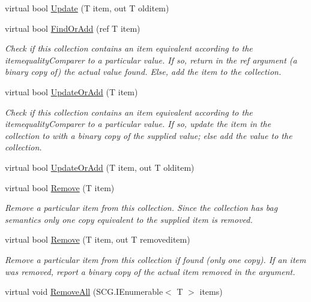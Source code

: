 \begin{DoxyCompactItemize}
virtual bool \hyperlink{class_c5_1_1_hashed_linked_list_a67ca2384da1dde0b651fe1ec01c8f0ba}{Update} (T item, out T olditem)
\item 
virtual bool \hyperlink{class_c5_1_1_hashed_linked_list_a71a1257a1ba4328713fb87daa3b45675}{Find\+Or\+Add} (ref T item)
\begin{DoxyCompactList}\small\item\em Check if this collection contains an item equivalent according to the itemequality\+Comparer to a particular value. If so, return in the ref argument (a binary copy of) the actual value found. Else, add the item to the collection. \end{DoxyCompactList}\item 
virtual bool \hyperlink{class_c5_1_1_hashed_linked_list_a5efb946b793ca1134c8f9d8b47d2cac7}{Update\+Or\+Add} (T item)
\begin{DoxyCompactList}\small\item\em Check if this collection contains an item equivalent according to the itemequality\+Comparer to a particular value. If so, update the item in the collection to with a binary copy of the supplied value; else add the value to the collection. \end{DoxyCompactList}\item 
virtual bool \hyperlink{class_c5_1_1_hashed_linked_list_a53e4be293af672a2354b7eb480ce48e6}{Update\+Or\+Add} (T item, out T olditem)
\item 
virtual bool \hyperlink{class_c5_1_1_hashed_linked_list_ad97f128fe00bf12c8e77678f08bd27e1}{Remove} (T item)
\begin{DoxyCompactList}\small\item\em Remove a particular item from this collection. Since the collection has bag semantics only one copy equivalent to the supplied item is removed. \end{DoxyCompactList}\item 
virtual bool \hyperlink{class_c5_1_1_hashed_linked_list_ab1348cf4b0e02e147f6dd08a539e2c61}{Remove} (T item, out T removeditem)
\begin{DoxyCompactList}\small\item\em Remove a particular item from this collection if found (only one copy). If an item was removed, report a binary copy of the actual item removed in the argument. \end{DoxyCompactList}\item 
virtual void \hyperlink{class_c5_1_1_hashed_linked_list_a13f0ec0b64eaba0412a48e8df37ba210}{Remove\+All} (S\+C\+G.\+I\+Enumerable$<$ T $>$ items)

\end{DoxyCompactItemize}

